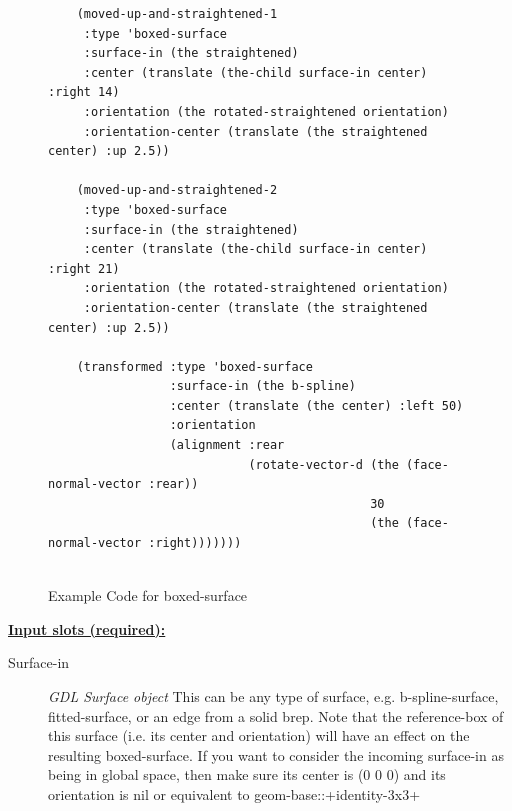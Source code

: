 \documentclass [11pt]{book}
\begin{document}
\begin{itemize}
\begin{figure}
\begin{lrbox}{\boxedverb}
\begin{minipage}{\linewidth}
{\begin{verbatim}
    (moved-up-and-straightened-1
     :type 'boxed-surface
     :surface-in (the straightened)
     :center (translate (the-child surface-in center) :right 14)
     :orientation (the rotated-straightened orientation)
     :orientation-center (translate (the straightened center) :up 2.5))
    
    (moved-up-and-straightened-2 
     :type 'boxed-surface
     :surface-in (the straightened)
     :center (translate (the-child surface-in center) :right 21)
     :orientation (the rotated-straightened orientation)
     :orientation-center (translate (the straightened center) :up 2.5))
    
    (transformed :type 'boxed-surface
                 :surface-in (the b-spline)
                 :center (translate (the center) :left 50)
                 :orientation 
                 (alignment :rear 
                            (rotate-vector-d (the (face-normal-vector :rear))
                                             30
                                             (the (face-normal-vector :right)))))))
 
\end{verbatim}}
\end{minipage}
\end{lrbox}
\fbox{\usebox{\boxedverb}}

\caption{Example Code for boxed-surface}

\label{fig:example-code-boxed-surface}

\end{figure}





\textbf{
\underline{Input slots (required):}}

\begin{description}

\item [Surface-in]
\emph{GDL Surface object} This can be any type of surface, e.g. b-spline-surface, fitted-surface, or an edge from a solid brep.
Note that the reference-box of this surface (i.e. its center and orientation) will have an effect on the resulting
boxed-surface. If you want to consider the incoming surface-in as being in global space, then make sure its center
is (0 0 0) and its orientation is nil or equivalent to geom-base::+identity-3x3+


\end{description}







\end{itemize}
\end{document}
